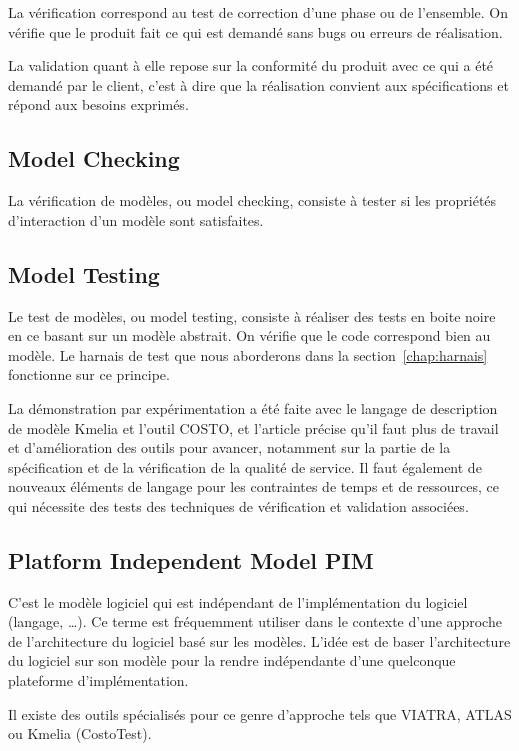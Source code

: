     La vérification correspond au test de correction d'une phase ou de l'ensemble. On vérifie que le produit fait ce qui est demandé sans bugs ou erreurs de réalisation.
    
    La validation quant à elle repose sur la conformité du produit avec ce qui a été demandé par le client, c'est à dire que la réalisation convient aux spécifications et répond aux besoins exprimés.
    
\subsection*{Model Checking}

    La vérification de modèles, ou model checking, consiste à tester si les propriétés d'interaction d'un modèle sont satisfaites. 
   

\subsection*{Model Testing}

    Le test de modèles, ou model testing, consiste à réaliser des tests en boite noire en ce basant sur un modèle abstrait. On vérifie que le code correspond bien au modèle. Le harnais de test que nous aborderons dans la section~\ref{chap:harnais} fonctionne sur ce principe.
    
    La démonstration par expérimentation a été faite avec le langage de description de modèle Kmelia et l'outil COSTO, et l'article précise qu'il faut plus de travail et d'amélioration des outils pour avancer, notamment sur la partie de la spécification et de la vérification de la qualité de service. Il faut également de nouveaux éléments de langage pour les contraintes de temps et de ressources, ce qui nécessite des tests des techniques de vérification et validation associées.

\subsection*{Platform Independent Model PIM}
    
    C'est le modèle logiciel qui est indépendant de l'implémentation du logiciel (langage, \dots ). Ce terme est fréquemment utiliser dans le contexte d'une approche de l'architecture du logiciel basé sur les modèles. L'idée est de baser l'architecture du logiciel sur son modèle pour la rendre indépendante d'une quelconque plateforme d'implémentation. 
    
    Il existe des outils  spécialisés pour ce genre d'approche tels que VIATRA, ATLAS  ou Kmelia (CostoTest).

